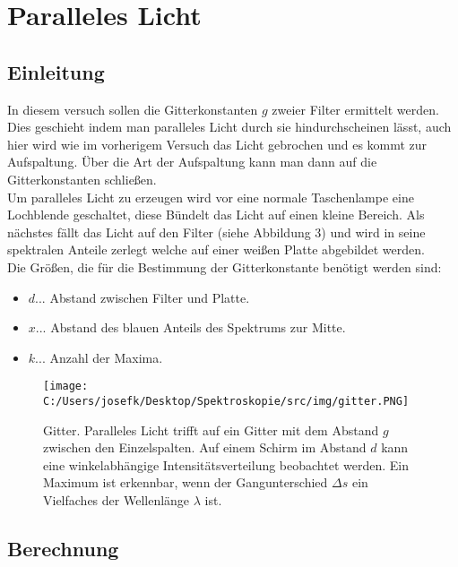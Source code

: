 \section{Paralleles Licht}

\subsection{Einleitung}
In diesem versuch sollen die Gitterkonstanten $g$ zweier Filter ermittelt werden. Dies geschieht indem man paralleles Licht durch sie hindurchscheinen lässt,
auch hier wird wie im vorherigem Versuch das Licht gebrochen und es kommt zur Aufspaltung. Über die Art der Aufspaltung kann man dann auf die Gitterkonstanten schließen. \\
Um paralleles Licht zu erzeugen wird vor eine normale Taschenlampe eine Lochblende geschaltet, diese Bündelt das Licht auf einen kleine Bereich. Als nächstes fällt
das Licht auf den Filter (siehe Abbildung 3) und wird in seine spektralen Anteile zerlegt welche auf einer weißen Platte abgebildet werden.\\
Die Größen, die für die Bestimmung der Gitterkonstante benötigt werden sind:
\begin{itemize}
	\item $d$... Abstand zwischen Filter und Platte.
	\item $x$... Abstand des blauen Anteils des Spektrums zur Mitte.
	\item $k$... Anzahl der Maxima.
\end{itemize}
\begin{center}
	\begin{minipage}{0.6\textwidth}
		\begin{figure}[H]
			\centering
			\texttt{[image: C:/Users/josefk/Desktop/Spektroskopie/src/img/gitter.PNG]}
			\caption{Gitter. Paralleles Licht trifft auf ein Gitter mit dem Abstand $g$ zwischen den Einzelspalten. Auf einem Schirm im
				Abstand $d$ kann eine winkelabhängige Intensitätsverteilung beobachtet werden. Ein Maximum ist erkennbar, wenn der
				Gangunterschied $\Delta s$ ein Vielfaches der Wellenlänge $\lambda$ ist.}
		\end{figure}
	\end{minipage}
\end{center}
\clearpage

\subsection{Berechnung}
